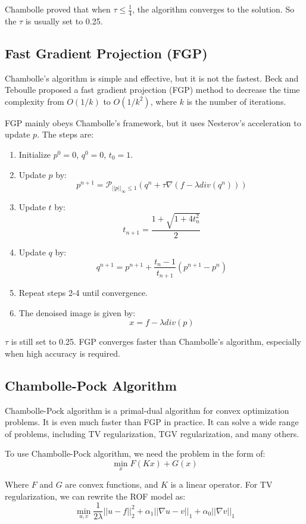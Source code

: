 \documentclass[10pt,a4paper,oneside,numbers=noenddot]{scrbook}
\theoremstyle{ctplain}
\theoremstyle{ctresult}
\begin{document}
Chambolle proved that when $\tau \leq \frac14$, the algorithm converges to the
solution. So the $\tau$ is usually set to 0.25.

\subsection{Fast Gradient Projection (FGP)}

Chambolle's algorithm is simple and effective, but it is not the fastest. Beck and
Teboulle proposed a fast gradient projection (FGP) method to decrease the time
complexity from $O(1/k)$ to $O(1/k^2)$, where $k$ is the number of iterations.

FGP mainly obeys Chambolle's framework, but it uses Nesterov's acceleration to
update $p$. The steps are:
\begin{enumerate}
  \item Initialize $p^0 = 0$, $q^0 = 0$, $t_0 = 1$.
  \item Update $p$ by:
  \[
    p^{n+1} = \mathcal{P}_{||p||_\infty \leq 1}(q^{n} + \tau \nabla (f - \lambda div(q^n)))
  \]
  \item Update $t$ by:
  \[
    t_{n+1} = \frac{1 + \sqrt{1 + 4t_n^2}}{2}
  \]
  \item Update $q$ by:
  \[
    q^{n+1} = p^{n+1} + \frac{t_n - 1}{t_{n+1}}(p^{n+1} - p^n)
  \]
  \item Repeat steps 2-4 until convergence.
  \item The denoised image is given by:
  \[
    x = f - \lambda div(p)
  \]
\end{enumerate}

$\tau$ is still set to 0.25. FGP converges faster than Chambolle's algorithm,
especially when high accuracy is required.

\subsection{Chambolle-Pock Algorithm}

Chambolle-Pock algorithm is a primal-dual algorithm for convex optimization
problems. It is even much faster than FGP in practice. It can solve a wide range of
problems, including TV regularization, TGV regularization, and many others.

To use Chambolle-Pock algorithm, we need the problem in the form of:
\[
  \min_x F(Kx) + G(x)
\]

Where $F$ and $G$ are convex functions, and $K$ is a linear operator. For TV
regularization, we can rewrite the ROF model as:
\[
  \min_{u,v} \frac{1}{2\lambda} ||u - f||_2^2 + \alpha_1 ||\nabla u - v||_1 +
  \alpha_0 ||\nabla v||_1
\]
\end{document}
